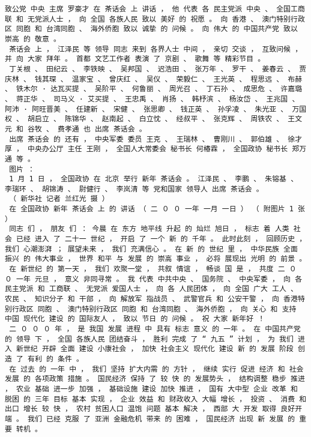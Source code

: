 \documentclass{article}
\begin{document}
\begin{Verbatim}[commandchars=\\\{\}]
 致公党 中央 主席 罗豪才 在 茶话会 上 讲话 ， 他 代表 各 民主党派 中央 、 全国工商联 和 无党派人士 ， 向 全国 各族人民 致以 美好 的 祝愿 。 向 香港 、 澳门特别行政区 同胞 和 台湾同胞 、 海外侨胞 致以 诚挚 的 问候 。 向 伟大 的 中国共产党 致以 崇高 的 敬意 。 
 茶话会 上 ， 江泽民 等 领导 同志 来到 各界人士 中间 ， 亲切 交谈 ， 互致问候 ， 并 向 大家 拜年 。 首都 文艺工作者 表演 了 京剧 、 歌舞 等 精彩节目 。 
 丁关根 、 田纪云 、 李铁映 、 吴邦国 、 迟浩田 、 张万年 、 罗干 、 姜春云 、 贾庆林 、 钱其琛 、 温家宝 、 曾庆红 、 吴仪 、 荣毅仁 、 王光英 、 程思远 、 布赫 、 铁木尔 · 达瓦买提 、 吴阶平 、 何鲁丽 、 周光召 、 丁石孙 、 成思危 、 许嘉璐 、 蒋正华 、 司马义 · 艾买提 、 王忠禹 、 肖扬 、 韩杼滨 、 杨汝岱 、 王兆国 、 阿沛 · 阿旺晋美 、 任建新 、 宋健 、 张思卿 、 钱正英 、 孙孚凌 、 朱光亚 、 万国权 、 胡启立 、 陈锦华 、 赵南起 、 白立忱 、 经叔平 、 张克辉 、 周铁农 、 王文元 和 谷牧 、 费孝通 也 出席 茶话会 。 
 出席 茶话会 的 还有 ， 中央军委 委员 王克 、 王瑞林 、 曹刚川 、 郭伯雄 、 徐才厚 ， 中央办公厅 主任 王刚 ， 全国人大常委会 秘书长 何椿霖 ， 全国政协 秘书长 郑万通 等 。 
 图片 ： 
 1 月 1 日 ， 全国政协 在 北京 举行 新年 茶话会 。 江泽民 、 李鹏 、 朱镕基 、 李瑞环 、 胡锦涛 、 尉健行 、 李岚清 等 党和国家 领导人 出席 茶话会 。 
 （ 新华社 记者 兰红光 摄 ） 
 在 全国政协 新年 茶话会 上 的 讲话 （ 二 ０ ０ 一年 一月 一日 ） （ 附图片 1 张 ） 
 同志 们 ， 朋友 们 ： 今晨 在 东方 地平线 升起 的 灿烂 旭日 ， 标志 着 人类 社会 已经 进入 了 二十一 世纪 ， 开启 了 一个 新 的 千年 。 此时此刻 ， 回顾历史 ， 我们 心潮澎湃 ； 展望未来 ， 我们 充满信心 。 在 新 的 世纪 里 ， 中华民族 全面 振兴 的 伟大事业 ， 世界 和平 与 发展 的 崇高 事业 ， 必将 展现出 光明 的 前景 。 
 在 新世纪 的 第一天 ， 我们 欢聚一堂 ， 共叙 情谊 ， 畅谈 国 是 ， 共度 二 ０ ０ 一年 元旦 ， 意义 非同寻常 。 我 代表 中共中央 、 国务院 、 中央军委 ， 向 各 民主党派 和 工商联 、 无党派 爱国人士 ， 向 各 人民团体 ， 向 全国 广大 工人 、 农民 、 知识分子 和 干部 ， 向 解放军 指战员 、 武警官兵 和 公安干警 ， 向 香港特别行政区 同胞 、 澳门特别行政区 同胞 和 台湾同胞 、 海外侨胞 ， 向 关心 和 支持 中国 现代化 建设 的 国际友人 ， 致以 节日 的 问候 。 祝 大家 新年好 ！ 
 二 ０ ０ ０ 年 ， 是 我国 发展 进程 中 具有 标志 意义 的 一年 。 在 中国共产党 的 领导 下 ， 全国 各族人民 团结奋斗 ， 胜利 完成 了 “ 九五 ” 计划 ， 为 我们 进入 新世纪 开辟 全面 建设 小康社会 ， 加快 社会主义 现代化 建设 新 的 发展 阶段 创造 了 有利 的 条件 。 
 在 过去 的 一年 中 ， 我们 坚持 扩大内需 的 方针 ， 继续 实行 促进 经济 和 社会 发展 的 各项政策 措施 。 国民经济 保持 了 较 快 的 发展势头 ， 结构调整 稳步 推进 ， 农业 基础 进一步 加强 ， 基础设施 建设 加快 推进 ， 国有 大中型 企业 改革 和 脱困 的 三年 目标 基本 实现 ， 企业 效益 和 财政收入 大幅 增长 ， 投资 、 消费 和 出口 增长 较 快 ， 农村 贫困人口 温饱 问题 基本 解决 ， 西部 大 开发 取得 良好开端 。 我们 已经 克服 了 亚洲 金融危机 带来 的 困难 ， 国民经济 出现 新 发展 的 重要 转机 。 

\end{Verbatim}
\end{document}

